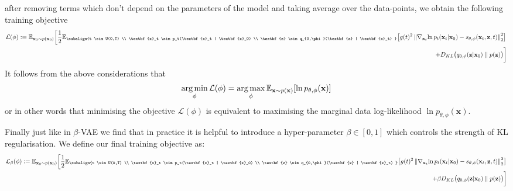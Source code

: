 after removing terms which don't depend on the parameters of the model and taking average over the data-points, we obtain the following training objective
\begin{equation*}
\begin{aligned}
    \mathcal{L}(\phi)  := \mathbb{E}_{\textbf{x}_0 \sim p(\textbf{x}_0)} \bigg[ 
    \frac{1}{2} \mathbb{E}_{\subalign{t \sim U(0,T) \\ \textbf{x}_t \sim p_t(\textbf{x}_t | \textbf{x}_0) \\ \textbf{z} \sim q_{0,\phi}(\textbf{z} | \textbf{x}_t) }} 
    \big[
    g(t)^2  \norm{ \nabla_{\textbf{x}_t}{\ln{p_t(\textbf{x}_t | \textbf{x}_0)}} - s_{\theta, \phi}(\textbf{x}_t, \textbf{z}, t)}_2^2  
    & \big] \\
    + D_{KL}\big( q_{0,\phi}(\textbf{z} | \textbf{x}_0)  \parallel p(\textbf{z})\big)  & \bigg]
\end{aligned}    
\end{equation*}
It follows from the above considerations that
\begin{gather*}
    \operatorname*{arg\,min}_\phi \mathcal{L} (\phi) = \operatorname*{arg\,max}_\phi \mathbb{E}_{\textbf{x} \sim p(\textbf{x})} [\ln p_{\theta, \phi}(\textbf{x}) ]
\end{gather*}
or in other words that minimising the objective $\mathcal{L}(\phi) $ is equivalent to maximising the marginal data log-likelihood $\ln p_{\theta, \phi}(\textbf{x}) $.

Finally just like in $\beta$-VAE we find that in practice it is helpful to introduce a hyper-parameter $\beta \in [0,1]$ which controls the strength of KL regularisation. We define our final training objective as:
\begin{equation*}
\begin{aligned}
    \mathcal{L}_\beta(\phi)  := \mathbb{E}_{\textbf{x}_0 \sim p(\textbf{x}_0)} \bigg[ 
    \frac{1}{2} \mathbb{E}_{\subalign{t \sim U(0,T) \\ \textbf{x}_t \sim p_t(\textbf{x}_t | \textbf{x}_0) \\ \textbf{z} \sim q_{0,\phi}(\textbf{z} | \textbf{x}_t) }} 
    \big[
    g(t)^2  \norm{ \nabla_{\textbf{x}_t}{\ln{p_t(\textbf{x}_t | \textbf{x}_0)}} - s_{\theta, \phi}(\textbf{x}_t, \textbf{z}, t)}_2^2  
    & \big] \\
    + \beta D_{KL}\big( q_{0,\phi}(\textbf{z} | \textbf{x}_0)  \parallel p(\textbf{z})\big)  & \bigg]
\end{aligned}    
\end{equation*}

